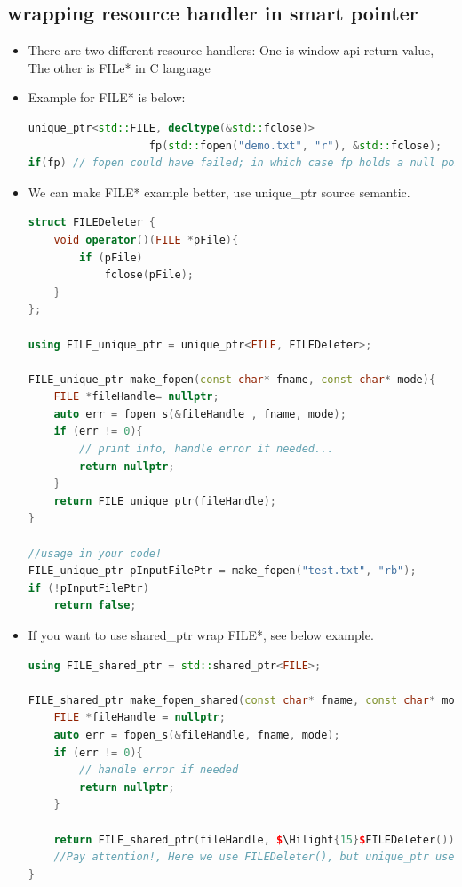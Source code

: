 \documentclass[a4paper,12pt,twoside]{book}
\newcommand{\Hilight}[1]{\makebox[0pt][l]{\color{yellow}\rule[-3pt]{#1em}{11pt}}}
\begin{document}
\subsection{wrapping resource handler in smart pointer}

\begin{itemize}
\item There are two different resource handlers: One is window api return value, The other is FILe* in C language


\item Example for FILE* is below:

\begin{lstlisting}[frame=single, language=c++]
unique_ptr<std::FILE, decltype(&std::fclose)> 
                   fp(std::fopen("demo.txt", "r"), &std::fclose);
if(fp) // fopen could have failed; in which case fp holds a null pointer
\end{lstlisting}

\item We can make FILE* example better, use unique\_ptr source semantic.
\begin{lstlisting}[frame=single, language=c++]
struct FILEDeleter {
    void operator()(FILE *pFile){
        if (pFile)
            fclose(pFile);
    }
};

using FILE_unique_ptr = unique_ptr<FILE, FILEDeleter>;

FILE_unique_ptr make_fopen(const char* fname, const char* mode){
    FILE *fileHandle= nullptr;
    auto err = fopen_s(&fileHandle , fname, mode); 
    if (err != 0){
        // print info, handle error if needed...
        return nullptr;
    }
    return FILE_unique_ptr(fileHandle);
}

//usage in your code!
FILE_unique_ptr pInputFilePtr = make_fopen("test.txt", "rb");
if (!pInputFilePtr)
    return false;

\end{lstlisting}

\item If you want to use shared\_ptr wrap FILE*, see below example.
\begin{lstlisting}[frame=single, language=c++]
using FILE_shared_ptr = std::shared_ptr<FILE>;

FILE_shared_ptr make_fopen_shared(const char* fname, const char* mode){
    FILE *fileHandle = nullptr;
    auto err = fopen_s(&fileHandle, fname, mode);
    if (err != 0){
        // handle error if needed
        return nullptr;
    }

    return FILE_shared_ptr(fileHandle, $\Hilight{15}$FILEDeleter());
    //Pay attention!, Here we use FILEDeleter(), but unique_ptr use FILEDeleter
}
\end{lstlisting}





\end{itemize}
\end{document}
